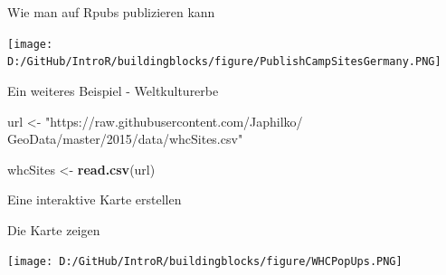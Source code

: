 \documentclass[ignorenonframetext,]{beamer}
\newenvironment{Shaded}{\begin{snugshade}}{\end{snugshade}}
\newcommand{\CommentTok}[1]{\textcolor[rgb]{0.00,0.40,1.00}{\textbf{\textit{#1}}}}
\newcommand{\DataTypeTok}[1]{\textcolor[rgb]{0.74,0.68,0.62}{\underline{#1}}}
\newcommand{\KeywordTok}[1]{\textcolor[rgb]{0.26,0.66,0.93}{\textbf{#1}}}
\newcommand{\NormalTok}[1]{\textcolor[rgb]{0.74,0.68,0.62}{#1}}
\newcommand{\OperatorTok}[1]{\textcolor[rgb]{0.74,0.68,0.62}{#1}}
\newcommand{\StringTok}[1]{\textcolor[rgb]{0.02,0.61,0.04}{#1}}
\begin{document}
\begin{frame}{Wie man auf Rpubs publizieren kann}
\protect\hypertarget{wie-man-auf-rpubs-publizieren-kann}{}

\texttt{[image: D:/GitHub/IntroR/buildingblocks/figure/PublishCampSitesGermany.PNG]}

\end{frame}

\begin{frame}[fragile]{Ein weiteres Beispiel - Weltkulturerbe}
\protect\hypertarget{ein-weiteres-beispiel---weltkulturerbe}{}

\begin{Shaded}
\begin{Highlighting}[]
\NormalTok{url <-}\StringTok{ "https://raw.githubusercontent.com/Japhilko/}
\StringTok{GeoData/master/2015/data/whcSites.csv"}

\NormalTok{whcSites <-}\StringTok{ }\KeywordTok{read.csv}\NormalTok{(url) }
\end{Highlighting}
\end{Shaded}

\end{frame}

\begin{frame}[fragile]{Eine interaktive Karte erstellen}
\protect\hypertarget{eine-interaktive-karte-erstellen}{}

\begin{Shaded}
\end{Shaded}

\end{frame}

\begin{frame}{Die Karte zeigen}
\protect\hypertarget{die-karte-zeigen}{}

\texttt{[image: D:/GitHub/IntroR/buildingblocks/figure/WHCPopUps.PNG]}

\end{frame}
\end{document}
